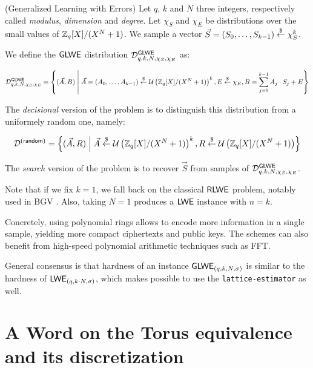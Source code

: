 \begin{definition}
	(Generalized Learning with Errors) Let $q$, $k$ and $N$ three integers, respectively called \textit{modulus}, \textit{dimension} and \textit{degree}. Let $\chi_S$ and $\chi_E$ be distributions over the small values of $\mathbb{Z}_q[X] / (X^N + 1)$. We sample a vector $\vec S = (S_0, \dots, S_{k-1}) \overset{\$}{\leftarrow} \chi_S^k$. 
	
	We define the $\textsf{GLWE}$ distribution $\mathcal{D}_{q, k, N, \chi_S, \chi_E}^{\textsf{GLWE}}$ as:
	
	\[
	\mathcal{D}_{q, k, N, \chi_S, \chi_E}^{\textsf{GLWE}} = \left \{ (\vec A, B) \;\middle|\; \vec A = (A_0, \dots, A_{k-1}) \overset{\$}{\leftarrow} \mathcal U \left ( \mathbb{Z}_q[X] / (X^N + 1) \right )^k, E \overset{\$}{\leftarrow} \chi_E, B = \sum_{j=0}^{k-1} A_j \cdot S_j + E \right \}
	\]
	
	The \textit{decisional} version of the problem is to distinguish this distribution from a uniformely random one, namely:
	
	\[
	\mathcal{D}^{(\textsf{random})} = \left \{(\vec A, R) \;\middle|\; \vec A \overset{\$}{\leftarrow} \mathcal U \left ( \mathbb{Z}_q[X] / (X^N + 1) \right )^k, R \overset{\$}{\leftarrow} \mathcal U \left ( \mathbb{Z}_q[X] / (X^N + 1) \right ) \right\}
	\]
	
	The \emph{search} version of the problem is to recover $\vec S$ from samples of $\mathcal{D}_{q, k , N, \chi_S, \chi_E}^{\textsf{GLWE}}$. 
	\label{def:GLWE}
	
\end{definition}

Note that if we fix $k = 1$, we fall back on the classical $\textsf{RLWE}$ problem, notably used in BGV \cite{bgv}. Also, taking $N=1$ produces a $\textsf{LWE}$ instance with $n = k$. 

Concretely, using polynomial rings allows to encode more information in a single sample, yielding more compact ciphertexts and public keys. The schemes can also benefit from high-speed polynomial arithmetic techniques such as FFT. 

General consensus is that hardness of an instance $\textsf{GLWE}_{(q, k, N, \sigma)}$ is similar to the hardness of $\textsf{LWE}_{(q, k \cdot N, \sigma)}$, which makes possible to use the \texttt{lattice-estimator} as well.








\section{A Word on the Torus equivalence and its discretization}
\label{sec:torus_equivalence}



